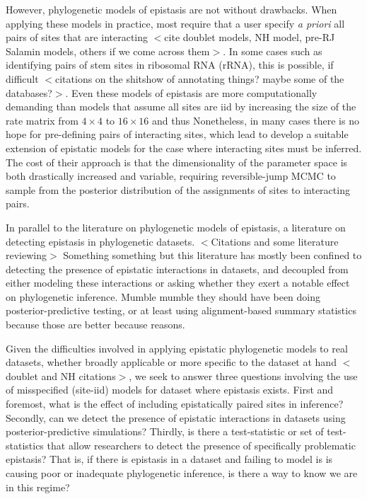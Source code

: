 \documentclass[11pt]{article}
\begin{document}
However, phylogenetic models of epistasis are not without drawbacks.
When applying these models in practice, most require that a user specify \textit{a priori} all pairs of sites that are interacting $<$cite doublet models, NH model, pre-RJ Salamin models, others if we come across them$>$.
In some cases such as identifying pairs of stem sites in ribosomal RNA (rRNA), this is possible, if difficult $<$citations on the shitshow of annotating things? maybe some of the databases?$>$.
Even these models of epistasis are more computationally demanding than models that assume all sites are iid by increasing the size of the rate matrix from $4 \times 4$ to $16 \times 16$ and thus
Nonetheless, in many cases there is no hope for pre-defining pairs of interacting sites, which lead \cite{meyer2019simultaneous} to develop a suitable extension of epistatic models for the case where interacting sites must be inferred.
The cost of their approach is that the dimensionality of the parameter space is both drastically increased and variable, requiring reversible-jump MCMC \citep{green1995reversible} to sample from the posterior distribution of the assignments of sites to interacting pairs.

In parallel to the literature on phylogenetic models of epistasis, a literature on detecting epistasis in phylogenetic datasets.
$<$Citations and some literature reviewing$>$
Something something but this literature has mostly been confined to detecting the presence of epistatic interactions in datasets, and decoupled from either modeling these interactions or asking whether they exert a notable effect on phylogenetic inference.
Mumble mumble they should have been doing posterior-predictive testing, or at least using alignment-based summary statistics because those are better because reasons.

Given the difficulties involved in applying epistatic phylogenetic models to real datasets, whether broadly applicable \citep{meyer2019simultaneous} or more specific to the dataset at hand $<$doublet and NH citations$>$, we seek to answer three questions involving the use of misspecified (site-iid) models for dataset where epistasis exists.
First and foremost, what is the effect of including epistatically paired sites in inference?
Secondly, can we detect the presence of epistatic interactions in datasets using posterior-predictive simulations?
Thirdly, is there a test-statistic or set of test-statistics that allow researchers to detect the presence of specifically problematic epistasis?
That is, if there is epistasis in a dataset and failing to model is is causing poor or inadequate phylogenetic inference, is there a way to know we are in this regime?
\end{document}
